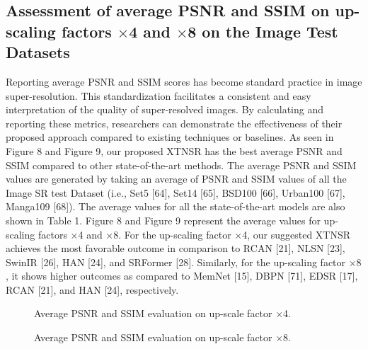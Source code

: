 \documentclass[twocolumn]{svjour3}          %
\begin{document}
\subsection{Assessment of average PSNR and SSIM on up-scaling factors $\times$4 and $\times$8 on the Image Test Datasets}

Reporting average PSNR and SSIM scores has become standard practice in image super-resolution. This standardization facilitates a consistent and easy interpretation of the quality of super-resolved images. By calculating and reporting these metrics, researchers can demonstrate the effectiveness of their proposed approach compared to existing techniques or baselines. As seen in Figure 8 and Figure 9, our proposed XTNSR has the best average PSNR and SSIM compared to other state-of-the-art methods. The average PSNR and SSIM values are generated by taking an average of PSNR and SSIM values of all the Image SR test Dataset (i.e., Set5 [64], Set14 [65], BSD100 [66], Urban100 [67], Manga109 [68]). The average values for all the state-of-the-art models are also shown in Table 1. Figure 8 and Figure 9 represent the average values for up-scaling factors ×4 and ×8. For the up-scaling factor ×4, our suggested XTNSR achieves the most favorable outcome in comparison to RCAN [21], NLSN [23], SwinIR [26], HAN [24], and SRFormer [28]. Similarly, for the up-scaling factor $\times8$, it shows higher outcomes as compared to MemNet [15], DBPN [71], EDSR [17], RCAN [21], and HAN [24], respectively.

\begin{figure}
  \centering
   \caption {Average PSNR and SSIM evaluation on up-scale factor ×4.}
    \label{fig:8}
\end{figure}

\begin{figure}
  \centering
   \caption {Average PSNR and SSIM evaluation on up-scale factor ×8.}
    \label{fig:9}
\end{figure}
\end{document}
